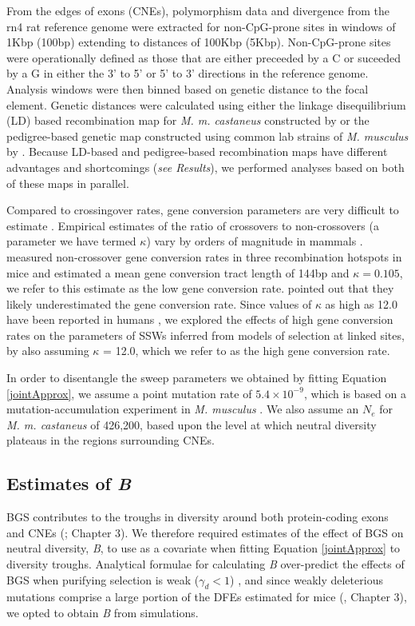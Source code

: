 	From the edges of exons (CNEs), polymorphism data and divergence from the rn4 rat reference genome were extracted for non-CpG-prone sites in windows of 1Kbp (100bp) extending to distances of 100Kbp (5Kbp). Non-CpG-prone sites were operationally defined as those that are either preceeded by a C or suceeded by a G in either the 3' to 5' or 5' to 3' directions in the reference genome. Analysis windows were then binned based on genetic distance to the focal element. Genetic distances were calculated using either the linkage disequilibrium (LD) based recombination map for \textit{M. m. castaneus} constructed by \cite{RN340} or the pedigree-based genetic map constructed using common lab strains of \textit{M. musculus} by \cite{RN232}. Because LD-based and pedigree-based recombination maps have different advantages and shortcomings (\textit{see Results}), we performed analyses based on both of these maps in parallel.

	Compared to crossingover rates, gene conversion parameters are very difficult to estimate \citep{RN247}. Empirical estimates of the ratio of crossovers to non-crossovers (a parameter we have termed $\kappa$) vary by orders of magnitude in mammals \citep{RN247}. \cite{RN263} measured non-crossover gene conversion rates in three recombination hotspots in mice and estimated a mean gene conversion tract length of 144bp and $\kappa = 0.105$, we refer to this estimate as the low gene conversion rate. \cite{RN263} pointed out that they likely underestimated the gene conversion rate. Since values of $\kappa$ as high as 12.0 have been reported in humans \citep{RN247}, we explored the effects of high gene conversion rates on the parameters of SSWs inferred from models of selection at linked sites, by also assuming $\kappa$ = 12.0, which we refer to as the high gene conversion rate. 

	In order to disentangle the sweep parameters we obtained by fitting Equation \ref{jointApprox}, we assume a point mutation rate of $5.4 \times 10^{-9}$, which is based on a mutation-accumulation experiment in \textit{M. musculus} \citep{RN228}. We also assume an $N_e$ for \textit{M. m. castaneus} of 426,200, based upon the level at which neutral diversity plateaus in the regions surrounding CNEs.

	\subsection{Estimates of \textit{B}} 
 
 	BGS contributes to the troughs in diversity around both protein-coding exons and CNEs (\citealt{RN122}; Chapter 3). We therefore required estimates of the effect of BGS on neutral diversity, \textit{B}, to use as a covariate when fitting Equation \ref{jointApprox} to diversity troughs. Analytical formulae for calculating \textit{B} over-predict the effects of BGS when purifying selection is weak ($\gamma_d < 1$) \citep{RN380,RN378}, and since weakly deleterious mutations comprise a large portion of the DFEs estimated for mice (\citealt{RN122}, Chapter 3), we opted to obtain \textit{B} from simulations.
 	
